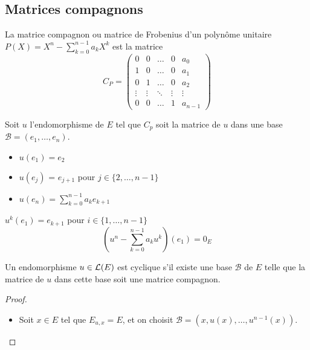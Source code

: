 \subsection{Matrices compagnons}



\begin{definition}
	La matrice compagnon ou matrice de Frobenius d'un polynôme unitaire $P(X)  = X^n - \sum_{k=0}^{n-1} a_k X^k$ est la matrice
	$$ C_P = \begin{pmatrix}
			0      & 0      & \ldots & 0      & a_0     \\
			1      & 0      & \ldots & 0      & a_1     \\
			0      & 1      & \ldots & 0      & a_2     \\
			\vdots & \vdots & \ddots & \vdots & \vdots  \\
			0      & 0      & \ldots & 1      & a_{n-1}
		\end{pmatrix}$$
\end{definition}

\begin{remarque}
	Soit $u$ l'endomorphisme de $E$ tel que $C_p$ soit la matrice de $u$ dans une base $\mathcal{B} = (e_1, \ldots, e_n)$.
	\begin{itemize}
		\item $u(e_1) = e_2$
		\item $u(e_j)$ = $e_{j+1}$ pour $j \in \{2, \ldots, n-1\}$
		\item $u(e_n) = \sum_{k=0}^{n-1} a_k e_{k+1}$
	\end{itemize}


	$u^k(e_1) = e_{k+1}$ pour $i \in \{1, \ldots, n-1\}$
	$$ (u^n - \sum_{k=0}^{n-1} a_k u^k)(e_1) = 0_E$$
\end{remarque}

\begin{remarque}
	Un endomorphisme $u \in \mathcal{L}(E)$ est cyclique s'il existe une base $\mathcal{B}$ de $E$ telle que la matrice
	de $u$ dans cette base soit une matrice compagnon.
\end{remarque}

\begin{proof}
	\begin{itemize}
		\item Soit $x \in E$ tel que $E_{u,x} = E$, et on choisit $\mathcal{B} = (x, u(x), \dots, u^{n-1}(x))$.
	\end{itemize}
\end{proof}

